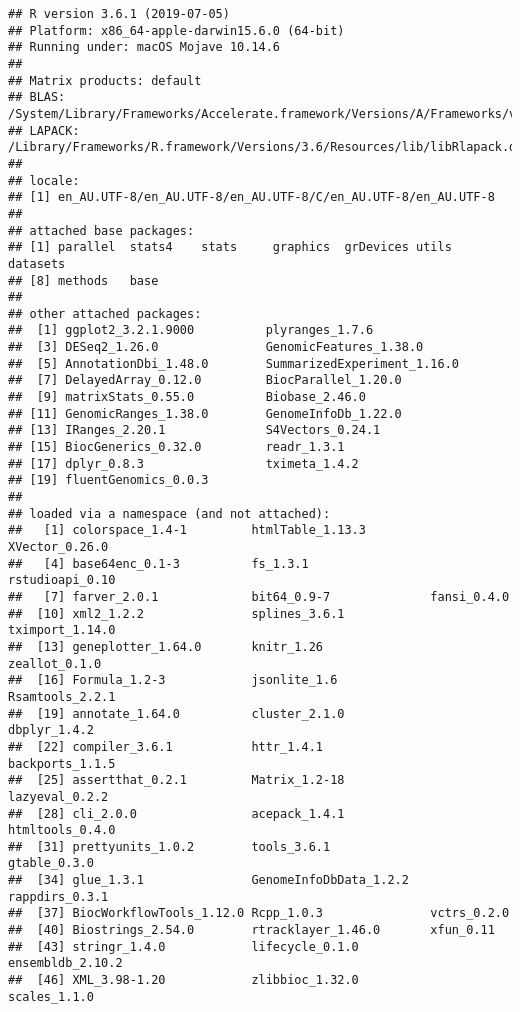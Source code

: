 \documentclass[
  9pt,
  a4paper,
]{extarticle}
\begin{document}
\begin{verbatim}
## R version 3.6.1 (2019-07-05)
## Platform: x86_64-apple-darwin15.6.0 (64-bit)
## Running under: macOS Mojave 10.14.6
## 
## Matrix products: default
## BLAS:   /System/Library/Frameworks/Accelerate.framework/Versions/A/Frameworks/vecLib.framework/Versions/A/libBLAS.dylib
## LAPACK: /Library/Frameworks/R.framework/Versions/3.6/Resources/lib/libRlapack.dylib
## 
## locale:
## [1] en_AU.UTF-8/en_AU.UTF-8/en_AU.UTF-8/C/en_AU.UTF-8/en_AU.UTF-8
## 
## attached base packages:
## [1] parallel  stats4    stats     graphics  grDevices utils     datasets 
## [8] methods   base     
## 
## other attached packages:
##  [1] ggplot2_3.2.1.9000          plyranges_1.7.6            
##  [3] DESeq2_1.26.0               GenomicFeatures_1.38.0     
##  [5] AnnotationDbi_1.48.0        SummarizedExperiment_1.16.0
##  [7] DelayedArray_0.12.0         BiocParallel_1.20.0        
##  [9] matrixStats_0.55.0          Biobase_2.46.0             
## [11] GenomicRanges_1.38.0        GenomeInfoDb_1.22.0        
## [13] IRanges_2.20.1              S4Vectors_0.24.1           
## [15] BiocGenerics_0.32.0         readr_1.3.1                
## [17] dplyr_0.8.3                 tximeta_1.4.2              
## [19] fluentGenomics_0.0.3       
## 
## loaded via a namespace (and not attached):
##   [1] colorspace_1.4-1         htmlTable_1.13.3         XVector_0.26.0          
##   [4] base64enc_0.1-3          fs_1.3.1                 rstudioapi_0.10         
##   [7] farver_2.0.1             bit64_0.9-7              fansi_0.4.0             
##  [10] xml2_1.2.2               splines_3.6.1            tximport_1.14.0         
##  [13] geneplotter_1.64.0       knitr_1.26               zeallot_0.1.0           
##  [16] Formula_1.2-3            jsonlite_1.6             Rsamtools_2.2.1         
##  [19] annotate_1.64.0          cluster_2.1.0            dbplyr_1.4.2            
##  [22] compiler_3.6.1           httr_1.4.1               backports_1.1.5         
##  [25] assertthat_0.2.1         Matrix_1.2-18            lazyeval_0.2.2          
##  [28] cli_2.0.0                acepack_1.4.1            htmltools_0.4.0         
##  [31] prettyunits_1.0.2        tools_3.6.1              gtable_0.3.0            
##  [34] glue_1.3.1               GenomeInfoDbData_1.2.2   rappdirs_0.3.1          
##  [37] BiocWorkflowTools_1.12.0 Rcpp_1.0.3               vctrs_0.2.0             
##  [40] Biostrings_2.54.0        rtracklayer_1.46.0       xfun_0.11               
##  [43] stringr_1.4.0            lifecycle_0.1.0          ensembldb_2.10.2        
##  [46] XML_3.98-1.20            zlibbioc_1.32.0          scales_1.1.0            

\end{verbatim}
\end{document}

